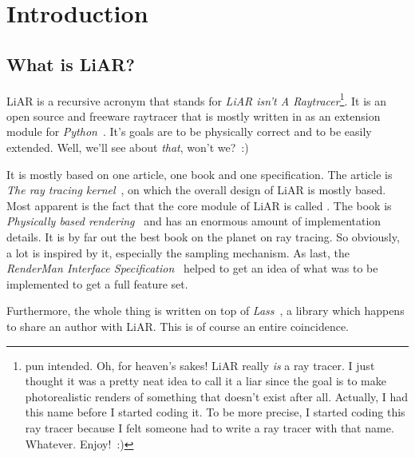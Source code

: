 %

\chapter{Introduction}

\section{What is LiAR?}

LiAR is a recursive acronym that stands for \emph{LiAR isn't A Raytracer}\footnote{pun intended. Oh, for heaven's sakes! LiAR really \emph{is} a ray tracer.  I just thought it was a pretty neat idea to call it a liar since the goal is to make photorealistic renders of something that doesn't exist after all.  Actually, I had this name before I started coding it.  To be more precise, I started coding this ray tracer because I felt someone had to write a ray tracer with that name.  Whatever.  Enjoy!~:)}.  It is an open source and freeware raytracer that is mostly written in \Cpp  as an extension module for \emph{Python}~\cite{Python}.  It's goals are to be physically correct and to be easily extended.  Well, we'll see about \emph{that}, won't we?~:)

It is mostly based on one article, one book and one specification.  The article is \emph{The ray tracing kernel}~\cite{kirk88ray}, on which the overall design of LiAR is mostly based.  Most apparent is the fact that the core module of LiAR is called .  The book is \emph{Physically based rendering}~\cite{Pharr2004pbrt} and has an enormous amount of implementation details. It is by far out the best book on the planet on ray tracing.  So obviously, a lot is inspired by it, especially the sampling mechanism.  As last, the \emph{RenderMan Interface Specification}~\cite{RISpec} helped to get an idea of what was to be implemented to get a full feature set.

Furthermore, the whole thing is written on top of \emph{Lass}~\cite{Lass}, a \Cpp library which happens to share an author with LiAR.  This is of course an entire coincidence.

